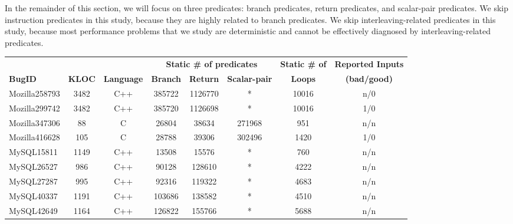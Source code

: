 In the remainder of this section, we will focus on three predicates: branch
predicates, return predicates, and scalar-pair predicates. We skip
instruction predicates in this study, because they are highly related to
branch predicates. We skip interleaving-related predicates in this study,
because most performance problems that we study are deterministic and
cannot be effectively diagnosed by interleaving-related 
predicates.

\begin{table}
  \centering
  \small
  \newcommand{\Yes}[1]{\checkmark{}$_#1$}
  \newcommand{\No}[0]{-}
  \begin{tabular}{lccccccc}
    \toprule
              &          &         & \multicolumn{3}{c}{\bf Static \# of predicates}& {\bf Static \# of} & {\bf Reported Inputs}\\
    \cmidrule(lr){4-6}
     {\bf BugID}     &{\bf KLOC}   &{\bf Language}    &{\bf Branch}    &{\bf Return}   &{\bf Scalar-pair}   &{\bf Loops}    &{\bf (bad/good)} \\
    \midrule
    Mozilla258793    & 3482        & C++              & 385722         & 1126770       & *                & 10016         & n/0            \\
    Mozilla299742    & 3482        & C++              & 385720         & 1126698       & *                & 10016         & 1/0            \\
    Mozilla347306    & 88          & C                & 26804          & 38634         & 271968             & 951           & n/n            \\
    Mozilla416628    & 105         & C                & 28788          & 39306         & 302496             & 1420          & 1/0            \\
    \midrule
    MySQL15811       & 1149        & C++              & 13508          & 15576         & *                & 760           & n/n            \\
    MySQL26527       & 986         & C++              & 90128          & 128610        & *                & 4222          & n/n            \\
    MySQL27287       & 995         & C++              & 92316          & 119322        & *                & 4683          & n/n            \\
    MySQL40337       & 1191        & C++              & 103686         & 138582        & *                & 4510          & n/n            \\
    MySQL42649       & 1164        & C++              & 126822         & 155766        & *                & 5688          & n/n            \\

\end{tabular}
\end{table}
